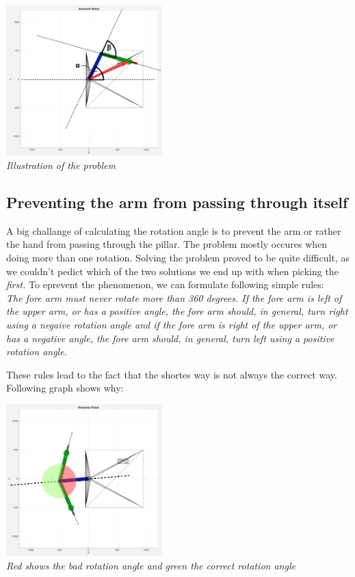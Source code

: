 \begin{center}
\includegraphics[width=0.45\textwidth]{imgs/AngleCalc/robot_rotAngleCalc.jpg}\\
\textit{Illustration of the problem}
\end{center}

\subsection{Preventing the arm from passing through itself}
A big challange of calculating the rotation angle is to prevent the arm or rather the hand from passing through the pillar. The problem mostly occures when doing more than one rotation. Solving the problem proved to be quite difficult, as we couldn't pedict which of the two solutions we end up with when picking the {\em first.} To eprevent the phenomenon, we can formulate following simple rules:\\

{\em The fore arm must never rotate more than 360 degrees. If the fore arm is left of the upper arm, or has a positive angle, the fore arm should, in general, turn right using a negaive rotation angle and if the fore arm is right of the upper arm, or has a negative angle, the fore arm should, in general, turn left using a positive rotation angle.}

\pagebreak

These rules lead to the fact that the shortes way is not always the correct way. Following graph shows why:

\begin{center}
\includegraphics[width=0.45\textwidth]{imgs/AngleCalc/robot_passThroughProblem.jpg}\\
\textit{Red shows the bad rotation angle and green the correct rotation angle}
\end{center}

